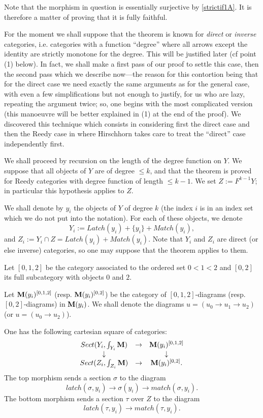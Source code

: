 Note that the morphism in question is essentially surjective by
\ref{strictif1A}. It is therefore a matter of proving that it is fully
faithful.

For the moment we shall suppose that the theorem is known for
{\em direct} or {\em inverse} categories, i.e.
categories with a function
``degree'' where all arrows except the identity are strictly
monotone for the degree. This will be justified later (cf point (1)
below). In fact, we shall make a first pass of our proof to
settle this case, then the second pass which we describe
now---the
reason for this contortion being that for the direct case we need
exactly the same arguments as for the general case, with even
a few simplifications but not enough to justify, for us who are
lazy, repeating the argument twice; so, one begins with the
most complicated version (this manoeuvre will be better explained in (1) at
the end of the proof). We discovered this technique
which consists in considering first the direct case and
then the Reedy case in \cite{Hirschhorn} where
Hirschhorn takes care to treat the ``direct'' case independently
first.

We shall proceed by recursion on the length of the degree function on $Y$.
We suppose that all objects of $Y$ are of degree $\leq k$, and that the
theorem is proved for Reedy categories with degree
function of length $\leq k-1$. We set $Z:= F^{k-1}Y$; in particular this
hypothesis applies to $Z$.

We shall denote by $y_i$ the objects of $Y$ of degree
$k$ (the index $i$ is in an index set which we do not put into the
notation). For each of
these objects, we denote
$$
Y_i:= Latch(y_i)+\{ y _i\} +Match (y_i),
$$
and $Z_i := Y_i \cap Z= Latch(y_i)+Match(y_i)$. Note that $Y_i$ and $Z_i$ are
direct (or else inverse) categories, so one may suppose that the
theorem applies to them.

Let $[0,1,2]$ be the category associated to
the ordered set $0 < 1 < 2$ and
$[0,2]$ its full subcategory with objects $0$ and $2$.

Let ${\bf M} (y_i) ^{[0,1,2]}$
(resp. ${\bf M} (y_i) ^{[0,2]}$)
be the category of $[0,1,2]$-diagrams (resp. $[0,2]$-diagrams)
in ${\bf M} (y_i)$. We shall denote the diagrams $u=(u_0\rightarrow u_1\rightarrow
u_2)$ (or $u=(u_0\rightarrow u_2)$).

One has the following cartesian square of categories:
$$
\begin{array}{ccc}
Sect (Y_i,\int _{Y_i}{\bf M} ) & \rightarrow & {\bf M} (y_i) ^{[0,1,2]}\\
\downarrow && \downarrow \\
Sect (Z_i,\int _{Z_i}{\bf M} ) & \rightarrow & {\bf M} (y_i) ^{[0,2]}.
\end{array}
$$
The top morphism sends a section $\sigma$ to the diagram
$$
latch(\sigma ,y_i) \rightarrow \sigma (y_i) \rightarrow match (\sigma , y_i).
$$
The bottom morphism sends a section $\tau$ over $Z$ to the diagram
$$
latch(\tau  ,y_i) \rightarrow  match (\tau , y_i).
$$

